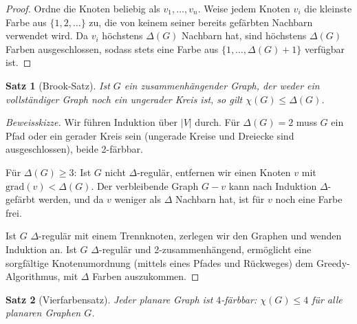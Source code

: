 \documentclass[12pt,a4paper]{amsart}
\newtheorem{theorem}{Satz}[section]
\theoremstyle{definition}
\theoremstyle{remark}
\newcommand{\chr}{\chi}
\newcommand{\grad}{\mathrm{grad}}
\begin{document}
\begin{proof}
Ordne die Knoten beliebig als $v_1, \ldots, v_n$. Weise jedem Knoten $v_i$
die kleinste Farbe aus $\{1, 2, \ldots\}$ zu, die von keinem seiner bereits
gefärbten Nachbarn verwendet wird. Da $v_i$ höchstens $\Delta(G)$ Nachbarn
hat, sind höchstens $\Delta(G)$ Farben ausgeschlossen, sodass stets eine
Farbe aus $\{1, \ldots, \Delta(G)+1\}$ verfügbar ist.
\end{proof}

\begin{theorem}[Brook-Satz]
\label{satz:brook}
Ist $G$ ein zusammenhängender Graph, der weder ein vollständiger Graph noch
ein ungerader Kreis ist, so gilt $\chr(G) \le \Delta(G)$.
\end{theorem}

\begin{proof}[Beweisskizze]
Wir führen Induktion über $|V|$ durch. Für $\Delta(G) = 2$ muss $G$ ein Pfad
oder ein gerader Kreis sein (ungerade Kreise und Dreiecke sind ausgeschlossen),
beide 2-färbbar.

Für $\Delta(G) \ge 3$: Ist $G$ nicht $\Delta$-regulär, entfernen wir einen
Knoten $v$ mit $\grad(v) < \Delta(G)$. Der verbleibende Graph $G - v$ kann
nach Induktion $\Delta$-gefärbt werden, und da $v$ weniger als $\Delta$ Nachbarn
hat, ist für $v$ noch eine Farbe frei.

Ist $G$ $\Delta$-regulär mit einem Trennknoten, zerlegen wir den Graphen
und wenden Induktion an. Ist $G$ $\Delta$-regulär und 2-zusammenhängend,
ermöglicht eine sorgfältige Knotenumordnung (mittels eines Pfades und
Rückweges) dem Greedy-Algorithmus, mit $\Delta$ Farben auszukommen.
\end{proof}

\begin{theorem}[Vierfarbensatz]
\label{satz:vierfarbensatz}
Jeder planare Graph ist $4$-färbbar: $\chr(G) \le 4$ für alle planaren
Graphen $G$.
\end{theorem}
\end{document}
